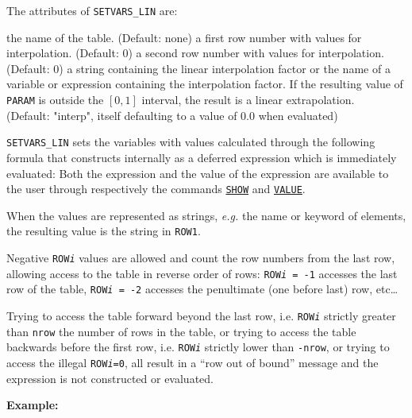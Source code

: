 The attributes of \texttt{SETVARS\_LIN} are:
\begin{madlist}
   the name of the table. (Default: none)
   a first row number with values for interpolation. (Default: 0)
   a second row number with values for interpolation. (Default: 0)
   a string containing the linear interpolation factor or
  the name of a variable or expression containing the interpolation
  factor. If the resulting value of \texttt{PARAM} is outside the
  $[0,1]$ interval, the result is a linear extrapolation. \\
  (Default: "interp", itself defaulting to a value of 0.0 when evaluated)
\end{madlist}

\texttt{SETVARS\_LIN} sets the variables with values calculated through
the following formula that \madx constructs internally as a deferred
expression which is immediately evaluated:
Both the expression and the value of the expression are available to the
user through respectively the commands \hyperref[sec:show]{\texttt{SHOW}} 
and \hyperref[sec:value]{\texttt{VALUE}}.

When the values are represented as strings, \textsl{e.g.} the name or 
keyword of elements, the resulting value is the string in \texttt{ROW1}.

Negative \texttt{ROW\textit{i}} values are allowed and count the row
numbers from the last row, allowing access to the table in reverse order
of rows: 
\texttt{ROW\textit{i}~=~-1} accesses the last row of the table,
\texttt{ROW\textit{i}~=~-2} accesses the penultimate (one before last)
row, etc\ldots  

Trying to access the table forward beyond the last row,
i.e. \texttt{ROW\textit{i}} strictly greater than \texttt{nrow} the
number of rows in the table, or trying to access the table backwards
before the first row, i.e. \texttt{ROW\textit{i}} strictly lower than
\texttt{-nrow}, or trying to access the illegal
\texttt{ROW\textit{i}=0}, all result in a ``row out of bound'' message
and the expression is not constructed or evaluated. 

\textbf{Example:}


